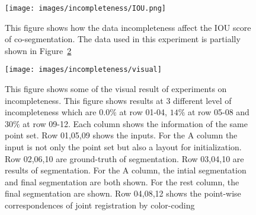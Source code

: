 \begin{figure}
	\centering
	\texttt{[image: images/incompleteness/IOU.png]}
	\caption{This figure shows how the data incompleteness affect the IOU score of co-segmentation. The data used in this experiment is partially shown in Figure~\ref{fig:incompleteness2}}
	\label{fig:incompleteness}
\end{figure}
\begin{figure}
	\centering
	\texttt{[image: images/incompleteness/visual]}
	\caption{This figure shows some of the visual result of experiments on incompleteness. This figure shows results at 3 different level of incompleteness which are $0.0\%$ at row 01-04, $14\%$ at row 05-08 and  $30\%$ at row 09-12. Each column shows the information of the same point set. Row 01,05,09 shows the inputs. For the A column the input is not only the point set but also a layout for initialization. Row 02,06,10 are ground-truth of segmentation. Row 03,04,10 are results of segmentation. For the A column, the intial segmentation and final segmentation are both shown. For the rest column, the final segmentation are shown.
	Row 04,08,12 shows the point-wise correspondences of joint registration by color-coding}
	\label{fig:incompleteness2}
\end{figure}

